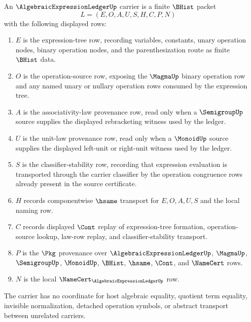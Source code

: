 \begin{definition}
\label{def:algebraic-expression-ledger-carrier}
An $\AlgebraicExpressionLedgerUp$ carrier is a finite $\BHist$ packet
$$
L=(E,O,A,U,S,H,C,P,N)
$$
with the following displayed rows:
\begin{enumerate}
\item $E$ is the expression-tree row, recording variables, constants, unary operation nodes, binary operation nodes, and the parenthesization route as finite $\BHist$ data.
\item $O$ is the operation-source row, exposing the $\MagmaUp$ binary operation row and any named unary or nullary operation rows consumed by the expression tree.
\item $A$ is the associativity-law provenance row, read only when a $\SemigroupUp$ source supplies the displayed rebracketing witness used by the ledger.
\item $U$ is the unit-law provenance row, read only when a $\MonoidUp$ source supplies the displayed left-unit or right-unit witness used by the ledger.
\item $S$ is the classifier-stability row, recording that expression evaluation is transported through the carrier classifier by the operation congruence rows already present in the source certificate.
\item $H$ records componentwise $\hsame$ transport for $E,O,A,U,S$ and the local naming row.
\item $C$ records displayed $\Cont$ replay of expression-tree formation, operation-source lookup, law-row replay, and classifier-stability transport.
\item $P$ is the $\Pkg$ provenance over $\AlgebraicExpressionLedgerUp$, $\MagmaUp$, $\SemigroupUp$, $\MonoidUp$, $\BHist$, $\hsame$, $\Cont$, and $\NameCert$ rows.
\item $N$ is the local $\NameCert_{\AlgebraicExpressionLedgerUp}$ row.
\end{enumerate}
The carrier has no coordinate for host algebraic equality, quotient term equality, invisible normalization, detached operation symbols, or abstract transport between unrelated carriers.
\end{definition}

